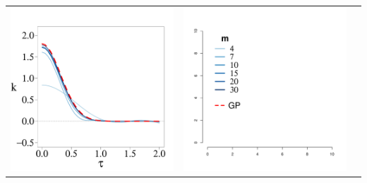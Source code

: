 \documentclass[8pt]{beamer} %
\begin{document}
\begin{frame}
\begin{itemize}
\begin{adjustwidth}{-4.3em}{-3em}
\begin{tabular}{ c c c }
\includegraphics[scale=0.17, trim = 0mm 14mm 5mm 14mm, clip]{ch5_fig3_Cov_part4.pdf} & 
\multirow{10}{1cm}{ \includegraphics[scale=0.25, trim = 28mm 30mm 100mm 30mm, clip]{ch5_fig3_legend.pdf}}\\

\end{tabular}
\end{adjustwidth}
\end{itemize}
\end{frame}
\end{document}
